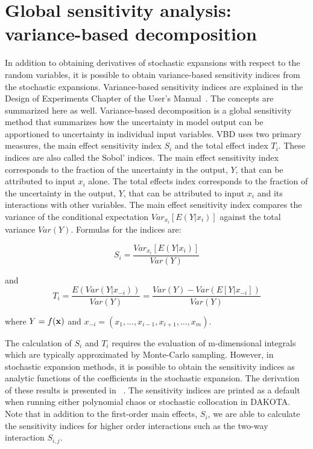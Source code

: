 \section{Global sensitivity analysis: variance-based decomposition}\label{uq:expansion:vbd}

In addition to obtaining derivatives of stochastic expansions with
respect to the random variables, it is possible to obtain
variance-based sensitivity indices from the stochastic expansions.
Variance-based sensitivity indices are explained in the Design of
Experiments Chapter of the User's Manual~\cite{UserMan}.  The concepts
are summarized here as well.  Variance-based decomposition is a global
sensitivity method that summarizes how the uncertainty in model output
can be apportioned to uncertainty in individual input variables.  VBD
uses two primary measures, the main effect sensitivity index $S_{i}$
and the total effect index $T_{i}$.  These indices are also called the
Sobol' indices. The main effect sensitivity index corresponds to the
fraction of the uncertainty in the output, $Y$, that can be attributed
to input $x_{i}$ alone.  The total effects index corresponds to the
fraction of the uncertainty in the output, $Y$, that can be attributed
to input $x_{i}$ and its interactions with other variables. The main
effect sensitivity index compares the variance of the conditional
expectation $Var_{x_{i}}[E(Y|x_{i})]$ against the total variance
$Var(Y)$.  Formulas for the indices are:

\begin{equation}
S_{i}=\frac{Var_{x_{i}}[E(Y|x_{i})]}{Var(Y)} \label{eq:sobol}
\end{equation}

and 
\begin{equation}
T_{i}=\frac{E(Var(Y|x_{-i}))}{Var(Y)}=\frac{Var(Y)-Var(E[Y|x_{-i}])}{Var(Y)}
\label{eq:total_sobol}
\end{equation}

where $Y=f({\bf x})$ and ${x_{-i}=(x_{1},...,x_{i-1},x_{i+1},...,x_{m})}$.

The calculation of $S_{i}$ and $T_{i}$ requires the evaluation of 
m-dimensional integrals which are typically approximated by Monte-Carlo 
sampling. However, in stochastic expansion methods, it is possible to 
obtain the sensitivity indices as analytic functions of the 
coefficients in the stochastic expansion.  The derivation 
of these results is presented in ~\cite{Tang10b}. The sensitivity 
indices are printed as a default when running either 
polynomial chaos or stochastic collocation in DAKOTA. 
Note that in addition to the first-order main effects, $S_{i}$, 
we are able to calculate the sensitivity indices for higher order 
interactions such as the two-way interaction  $S_{i,j}$.   

